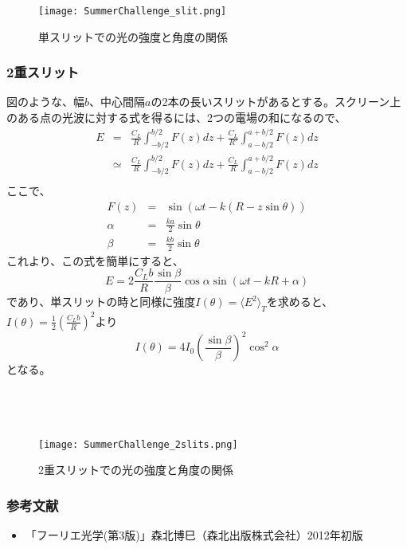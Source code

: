\documentclass[uplatex,10pt,a4j]{jsarticle}
\begin{document}
\begin{figure}[h]
  \begin{center}
    \texttt{[image: SummerChallenge\_slit.png]}
    \caption{単スリットでの光の強度と角度の関係}
  \end{center}
\end{figure}

\clearpage

\subsubsection{2重スリット}
図のような、幅$b$、中心間隔$a$の2本の長いスリットがあるとする。スクリーン上のある点の光波に対する式を得るには、2つの電場の和になるので、
\begin{eqnarray*}
  E &=& \frac{C_L}{R} \int_{-b/2}^{b/2} F(z) dz + \frac{C_L}{R'} \int_{a-b/2}^{a+b/2} F(z) dz \\
  &\simeq& \frac{C_L}{R} \int_{-b/2}^{b/2} F(z) dz + \frac{C_L}{R} \int_{a-b/2}^{a+b/2} F(z) dz \\
\end{eqnarray*}
ここで、
\begin{eqnarray*}
  F(z) &=& \sin(\omega t - k(R-z\sin\theta)) \\
  \alpha &=& \frac{ka}{2} \sin\theta \\
  \beta &=& \frac{kb}{2} \sin\theta
\end{eqnarray*}
これより、この式を簡単にすると、
\[
  E = 2 \frac{C_L b}{R} \frac{\sin\beta}{\beta} \cos\alpha \sin(\omega t -kR + \alpha)
\]
であり、単スリットの時と同様に強度$I(\theta) = \langle E^2\rangle_T$を求めると、$I(\theta) = \frac{1}{2} (\frac{C_L b}{R})^2$より
\[
  I(\theta) = 4I_0 \left(\frac{\sin \beta}{\beta}\right)^2 \cos^2 \alpha
\]
となる。\\
\\
\\
\\
\begin{figure}[h]
  \begin{center}
    \texttt{[image: SummerChallenge\_2slits.png]}
    \caption{2重スリットでの光の強度と角度の関係}
  \end{center}
\end{figure}

\subsubsection{参考文献}
\begin{itemize}
  \item 「フーリエ光学(第3版)」森北博巳（森北出版株式会社）2012年初版
\end{itemize}
\clearpage
\end{document}
